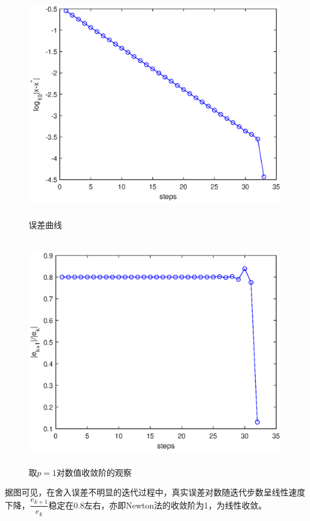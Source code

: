 \documentclass[UTF8,a4paper,10pt]{ctexart}
\begin{document}
        \begin{figure}[htbp]
            \centering
            \includegraphics[width=14cm,height=10cm]{2_error_origin.eps}
            \caption{误差曲线}
        \end{figure}
        \begin{figure}[htbp]
            \centering
            \includegraphics[width=14cm,height=10cm]{2_order_origin.eps}
            \caption{取$p=1$对数值收敛阶的观察} 
        \end{figure}
        据图可见，在舍入误差不明显的迭代过程中，真实误差对数随迭代步数呈线性速度下降，$\dfrac{e_{k+1}}{e_k}$稳定在0.8左右，亦即Newton法的收敛阶为1，为线性收敛。
        \par
\end{document}
